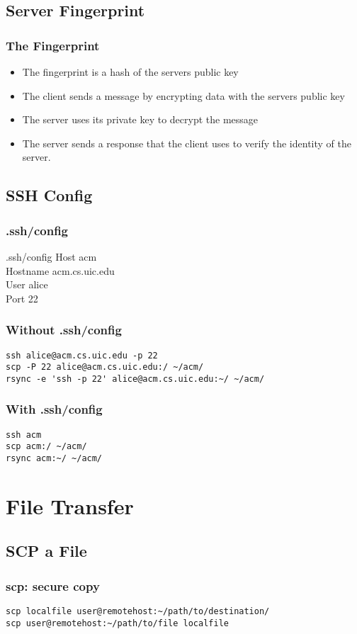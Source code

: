 \documentclass[hyperref={pdfpagelabels=false}]{beamer}
\begin{document}
\subsection{Server Fingerprint}
\frame
{
    \frametitle{The Fingerprint}
    \begin{itemize}
    \item{The fingerprint is a hash of the servers public key}
    \item{The client sends a message by encrypting data with the servers public key}
    \item{The server uses its private key to decrypt the message}
    \item{The server sends a response that the client uses to verify the identity of the server.}
    \end{itemize}
}
\subsection{SSH Config}
\frame
{
	\frametitle{.ssh/config}
	\begin{block}{.ssh/config}
	Host acm\\
	Hostname acm.cs.uic.edu\\
	User alice\\
	Port 22
	\end{block}
}
\begin{frame}[fragile]
\frametitle{Without .ssh/config}
\begin{verbatim}
ssh alice@acm.cs.uic.edu -p 22
scp -P 22 alice@acm.cs.uic.edu:/ ~/acm/
rsync -e 'ssh -p 22' alice@acm.cs.uic.edu:~/ ~/acm/
\end{verbatim}
\end{frame}
\begin{frame}[fragile]
\frametitle{With .ssh/config}
\begin{verbatim}
ssh acm
scp acm:/ ~/acm/
rsync acm:~/ ~/acm/
\end{verbatim}
\end{frame}
\section{File Transfer}
\subsection{SCP a File}
\begin{frame}[fragile]
    \frametitle{scp: secure copy}
\begin{verbatim}
scp localfile user@remotehost:~/path/to/destination/
scp user@remotehost:~/path/to/file localfile
\end{verbatim}
\end{frame}
\end{document}
